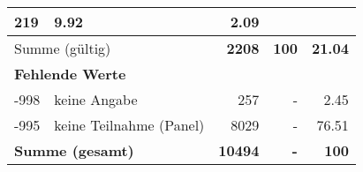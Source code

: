 \begin{longtable}{lXrrr}
       \num{219} &
       \num[round-mode=places,round-precision=2]{9,92} &
         \num[round-mode=places,round-precision=2]{2,09} \\
     \midrule
     \multicolumn{2}{l}{Summe (gültig)} &
       \textbf{\num{2208}} &
     \textbf{100} &
       \textbf{\num[round-mode=places,round-precision=2]{21,04}} \\
     \multicolumn{5}{l}{\textbf{Fehlende Werte}}\\
       -998 &
       keine Angabe &
         \num{257} &
        - &
         \num[round-mode=places,round-precision=2]{2,45} \\
       -995 &
       keine Teilnahme (Panel) &
         \num{8029} &
        - &
         \num[round-mode=places,round-precision=2]{76,51} \\
     \midrule
     \multicolumn{2}{l}{\textbf{Summe (gesamt)}} &
          \textbf{\num{10494}} &
        \textbf{-} &
        \textbf{100} \\
     \bottomrule
     \end{longtable}
     
